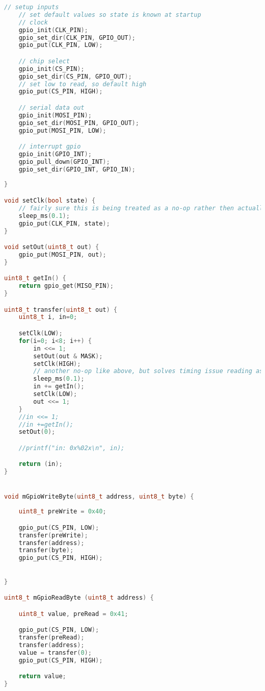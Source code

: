 \documentclass[sigconf]{article}
\begin{document}
\begin{lstlisting}[basicstyle=\footnotesize\ttfamily, language=c,breaklines]
    // setup inputs
    // set default values so state is known at startup
    // clock
    gpio_init(CLK_PIN);
    gpio_set_dir(CLK_PIN, GPIO_OUT);
    gpio_put(CLK_PIN, LOW);

    // chip select
    gpio_init(CS_PIN);
    gpio_set_dir(CS_PIN, GPIO_OUT);
    // set low to read, so default high
    gpio_put(CS_PIN, HIGH);

    // serial data out
    gpio_init(MOSI_PIN);
    gpio_set_dir(MOSI_PIN, GPIO_OUT);
    gpio_put(MOSI_PIN, LOW);

    // interrupt gpio
    gpio_init(GPIO_INT);
    gpio_pull_down(GPIO_INT);
    gpio_set_dir(GPIO_INT, GPIO_IN);
    
}

void setClk(bool state) {
    // fairly sure this is being treated as a no-op rather then actually sleeping for intended time
    sleep_ms(0.1); 
    gpio_put(CLK_PIN, state);
}

void setOut(uint8_t out) {
    gpio_put(MOSI_PIN, out);
}

uint8_t getIn() {
    return gpio_get(MISO_PIN);
}

uint8_t transfer(uint8_t out) {
    uint8_t i, in=0;

    setClk(LOW);
    for(i=0; i<8; i++) {
        in <<= 1;
        setOut(out & MASK);
        setClk(HIGH);
        // another no-op like above, but solves timing issue reading as long as set to a number < 1
        sleep_ms(0.1); 
        in += getIn();
        setClk(LOW);
        out <<= 1;
    }
    //in <<= 1;
    //in +=getIn();
    setOut(0);

    //printf("in: 0x%02x\n", in);

    return (in);
}


void mGpioWriteByte(uint8_t address, uint8_t byte) {
    
    uint8_t preWrite = 0x40;

    gpio_put(CS_PIN, LOW);
    transfer(preWrite);
    transfer(address);
    transfer(byte);
    gpio_put(CS_PIN, HIGH);

    
}

uint8_t mGpioReadByte (uint8_t address) {

    uint8_t value, preRead = 0x41;

    gpio_put(CS_PIN, LOW);
    transfer(preRead);
    transfer(address);
    value = transfer(0);
    gpio_put(CS_PIN, HIGH);

    return value;
}

\end{lstlisting}



\end{document}
